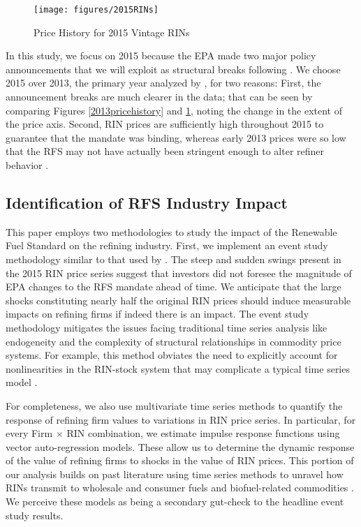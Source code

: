 \documentclass[11pt]{article}
\begin{document}
\begin{figure}[h]
	\caption{Price History for 2015 Vintage RINs}
	\label{2015pricehistory}
	\texttt{[image: figures/2015RINs]}
\end{figure}

In this study, we focus on 2015 because the EPA made two major policy announcements that we will exploit as structural breaks following \cite{Lade2018a}. We choose 2015 over 2013, the primary year analyzed by \cite{Lade2018a}, for two reasons: First, the announcement breaks are much clearer in the data; that can be seen by comparing Figures \ref{2013pricehistory} and \ref{2015pricehistory}, noting the change in the extent of the price axis. Second, RIN prices are sufficiently high throughout 2015 to guarantee that the mandate was binding, whereas early 2013 prices were so low that the RFS may not have actually been stringent enough to alter refiner behavior \citep{Whistance2016}.

\subsection{Identification of RFS Industry Impact}

This paper employs two methodologies to study the impact of the Renewable Fuel Standard on the refining industry. First, we implement an event study methodology similar to that used by \cite{Lade2018a}. The steep and sudden swings present in the 2015 RIN price series suggest that investors did not foresee the magnitude of EPA changes to the RFS mandate ahead of time. We anticipate that the large shocks constituting nearly half the original RIN prices should induce measurable impacts on refining firms if indeed there is an impact. The event study methodology mitigates the issues facing traditional time series analysis like endogeneity and the complexity of structural relationships in commodity price systems. For example, this method obviates the need to explicitly account for nonlinearities in the RIN-stock system that may complicate a typical time series model \citep{Serra2011}.

For completeness, we also use multivariate time series methods to quantify the response of refining firm values to variations in RIN price series. In particular, for every Firm $\times$ RIN combination, we estimate impulse response functions using vector auto-regression models. These allow us to determine the dynamic response of the value of refining firms to shocks in the value of RIN prices. This portion of our analysis builds on past literature using time series methods to unravel how RINs transmit to wholesale and consumer fuels \citep{Knittel2017} and biofuel-related commodities \citep{Whistance2014, Whistance2016}. We perceive these models as being a secondary gut-check to the headline event study results.
\end{document}

